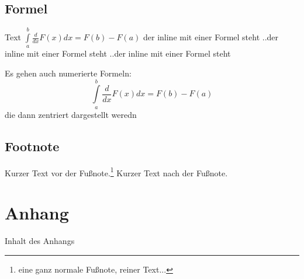 \section{Formel}
Text $\int\limits_a^b {\frac{d}{dx}F(x)dx} = F(b)-F(a)$ der inline mit einer Formel steht ..der inline mit einer Formel steht ..der inline mit einer Formel steht

Es gehen auch numerierte Formeln:
\begin{equation}
\int\limits_a^b {\frac{d}{dx}F(x)dx} = F(b)-F(a)
\end{equation}
die dann zentriert dargestellt weredn

\section{Footnote}
Kurzer Text vor der Fußnote.\footnote{eine ganz normale Fußnote, reiner Text...} Kurzer Text nach der Fußnote.


\seAppendix{}

\setcounter{page}{8}

\chapter{Anhang}

Inhalt des Anhangs

\newpage
\sePrintGlossary{}

\sePrintBibliography{}



\seEhrenwoertlicheErklaerung{}


